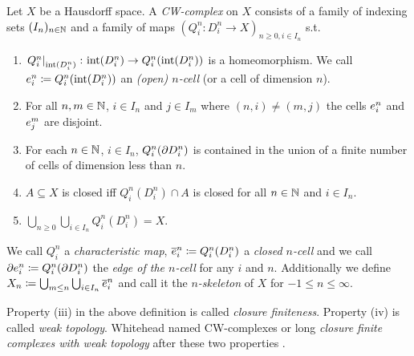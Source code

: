 \begin{defi}\label{defi:CWComplex2}
    Let $X$ be a Hausdorff space. 
    A \emph{CW-complex} on $X$ consists of a family of indexing sets $(I_n)_{n \in \bN}$ and a family of maps $(Q_i^n\colon D_i^n\rightarrow X)_{n \ge 0, i \in I_n}$ s.t.
    \begin{enumerate}
        \item $\restrict{Q_i^n}{\interior{D_i^n}}\colon \interior{D_i^n} \rightarrow Q_i^n(\interior{D_i^n})$ is a homeomorphism. We call $\ocell{n}{i} \coloneq Q_i^n(\interior{D_i^n})$ an \emph{(open) $n$-cell} (or a cell of dimension $n$).
        \item For all $n, m \in \bN$, $i \in I_n$ and $j \in I_m$ where $(n, i) \ne (m, j)$ the cells $\ocell{n}{i}$ and $\ocell{m}{j}$ are disjoint.
        \item For each $n \in \bN$, $i \in I_n$, $Q_i^n(\boundary D_i^n)$ is contained in the union of a finite number of cells of dimension less than $n$.
        \item $A \subseteq X$ is closed iff $Q_i^n(D_i^n) \cap A$ is closed for all $n \in \bN$ and $i \in I_n$.
        \item $\bigcup_{n \ge 0}\bigcup_{i \in I_n} Q_i^n(D_i^n) = X$.
    \end{enumerate}
    We call $Q_i^n$ a \emph{characteristic map}, $\ccell{n}{i} \coloneq Q_i^n(D_i^n)$ a \emph{closed $n$-cell} and we call $\ecell{n}{i} \coloneq Q_i^n(\boundary D_i^n)$ the \emph{edge of the $n$-cell} for any $i$ and $n$.
    Additionally we define $X_n \coloneq \bigcup_{m \le n} \bigcup_{i \in I_n} \ccell{n}{i}$ and call it the \emph{$n$-skeleton} of $X$ for $-1 \le n \le \infty$.
\end{defi}


\begin{rem}
    Property (iii) in the above definition is called \emph{closure finiteness}. 
    Property (iv) is called \emph{weak topology}.
    Whitehead named CW-complexes or long \emph{closure finite complexes with weak topology} after these two properties \cite{Whitehead2018}.
\end{rem}

